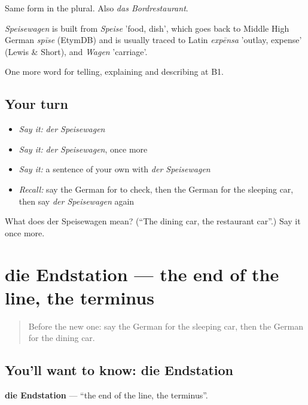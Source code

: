 Same form in the plural. Also \emph{das Bordrestaurant}.

\begin{cousinweb}
\emph{Speisewagen} is built from \emph{Speise} 'food, dish', which goes back to Middle High German \emph{spīse} (EtymDB) and is usually traced to Latin \emph{expēnsa} 'outlay, expense' (Lewis \& Short), and \emph{Wagen} 'carriage'.
\end{cousinweb}

\begin{grammarlens}[title={What you've built}]
One more word for telling, explaining and describing at B1.
\end{grammarlens}

\subsection*{Your turn}
\begin{itemize}
\raggedright
  \item \emph{Say it:} \emph{der Speisewagen}
  \item \emph{Say it:} \emph{der Speisewagen}, once more
  \item \emph{Say it:} a sentence of your own with \emph{der Speisewagen}
  \item \emph{Recall:} say the German for to check, then the German for the sleeping car, then say \emph{der Speisewagen} again
\end{itemize}

\begin{tcolorbox}[breakable,colback=teal!4,colframe=teal!35!black,title={Before you move on}]
What does der Speisewagen mean? (\textquotedblleft{}The dining car, the restaurant car\textquotedblright{}.) Say it once more.
\end{tcolorbox}
\section[die Endstation]{die Endstation — the end of the line, the terminus}

\label{lesson:GE-C413-endstation}



\begin{quote}
Before the new one: say the German for the sleeping car, then the German for the dining car.
\end{quote}

\subsection*{You'll want to know: die Endstation}
\textbf{die Endstation} — \textquotedblleft{}the end of the line, the terminus\textquotedblright{}.

